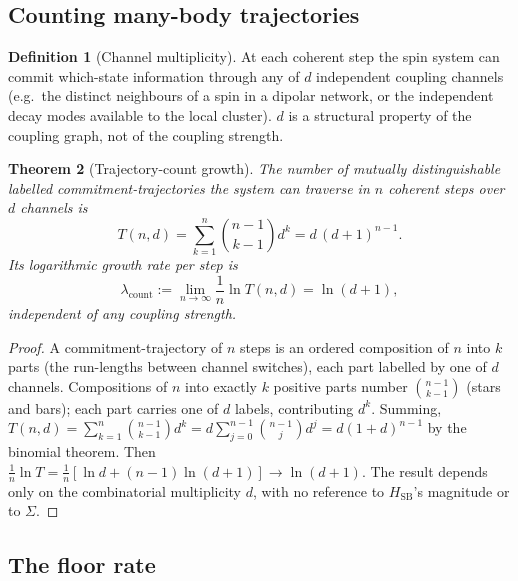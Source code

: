 \documentclass[twocolumn,10pt,a4paper]{article}
\theoremstyle{thmstyle}
\newtheorem{theorem}{Theorem}[section]
\theoremstyle{definition}
\newtheorem{definition}[theorem]{Definition}
\theoremstyle{remark}
\begin{document}
\subsection{Counting many-body trajectories}

\begin{definition}[Channel multiplicity]
\label{def:channels}
At each coherent step the spin system can commit which-state information
through any of $d$ independent coupling channels (e.g.\ the distinct
neighbours of a spin in a dipolar network, or the independent decay
modes available to the local cluster). $d$ is a structural property of the
coupling graph, not of the coupling strength.
\end{definition}

\begin{theorem}[Trajectory-count growth]
\label{thm:trajectory-count}
The number of mutually distinguishable labelled commitment-trajectories the
system can traverse in $n$ coherent steps over $d$ channels is
\begin{equation}
T(n,d)=\sum_{k=1}^{n}\binom{n-1}{k-1}d^{k}=d\,(d+1)^{n-1}.
\label{eq:Tnd}
\end{equation}
Its logarithmic growth rate per step is
\begin{equation}
\lambda_{\mathrm{count}}
:=\lim_{n\to\infty}\frac{1}{n}\ln T(n,d)=\ln(d+1),
\label{eq:lambda}
\end{equation}
independent of any coupling strength.
\end{theorem}

\begin{proof}
A commitment-trajectory of $n$ steps is an ordered composition of $n$ into
$k$ parts (the run-lengths between channel switches), each part labelled by
one of $d$ channels. Compositions of $n$ into exactly $k$ positive parts
number $\binom{n-1}{k-1}$ (stars and bars); each part carries one of $d$
labels, contributing $d^{k}$. Summing,
$T(n,d)=\sum_{k=1}^{n}\binom{n-1}{k-1}d^{k}
=d\sum_{j=0}^{n-1}\binom{n-1}{j}d^{j}=d(1+d)^{n-1}$ by the binomial
theorem. Then $\tfrac1n\ln T=\tfrac1n[\ln d+(n-1)\ln(d+1)]\to\ln(d+1)$.
The result depends only on the combinatorial multiplicity $d$, with no
reference to $H_{\mathrm{SB}}$'s magnitude or to $\Sigma$.
\end{proof}

\subsection{The floor rate}
\end{document}
